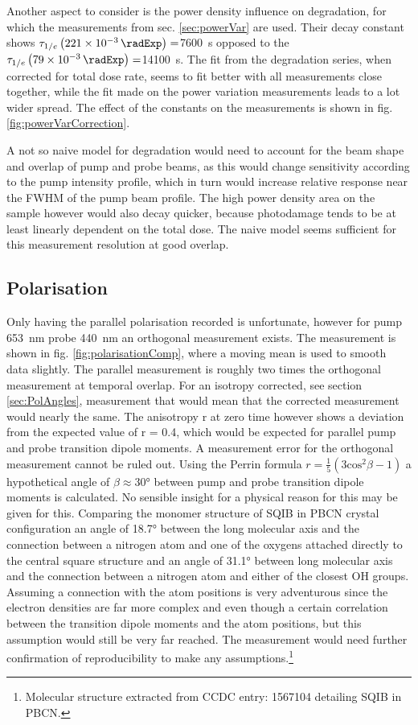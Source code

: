 \documentclass[twoside,openright]{scrreprt}
\begin{document}
{Another aspect to consider is the power density influence on degradation, for which the measurements from sec. \ref{sec:powerVar} are used.  Their decay constant shows $\tau_{1/e}\left(\SI{221e-3}{\radExp}\right)=$\SI{7600}{\second}  opposed to the $\tau_{1/e}\left(\SI{79e-3}{\radExp}\right)=$\SI{14100}{\second}. The fit from the degradation series, when corrected for total dose rate, seems to fit better with all measurements close together, while the fit made on the power variation measurements leads to a lot wider spread. The effect of the constants on the measurements is shown in fig. \ref{fig:powerVarCorrection}.

A not so naive model for degradation would need to account for the beam shape and overlap of pump and probe beams, as this would change sensitivity according to the pump intensity profile, which in turn would increase relative response near the FWHM of the pump beam profile. The high power density area on the sample however would also decay quicker, because photodamage tends to be at least linearly dependent on the total dose. The naive model seems sufficient for this measurement resolution at good overlap.

\subsection{Polarisation}
Only having the parallel polarisation recorded is unfortunate, however for pump \SI{653}{\nano\meter} probe \SI{440}{\nano\meter} an orthogonal measurement exists. The measurement is shown in fig. \ref{fig:polarisationComp}, where a moving mean is used to smooth data slightly. The parallel measurement is roughly two times the orthogonal measurement at temporal overlap. For an isotropy corrected, see section \ref{sec:PolAngles}, measurement that would mean that the corrected measurement would nearly the same. The anisotropy r at zero time however shows a deviation from the expected value of r = 0.4, which would be expected for parallel pump and probe transition dipole moments. A measurement error for the orthogonal measurement cannot be ruled out. Using the Perrin formula $r = \frac{1}{5}(3\mathrm{cos}^2\beta-1)$ a hypothetical angle of $\beta \approx \ang{30}$ between pump and probe transition dipole moments is calculated. No sensible insight for a physical reason for this may be given for this. 
Comparing the monomer structure of SQIB in PBCN crystal configuration an angle of \ang{18.7} between the long molecular axis and the connection between a nitrogen atom and one of the oxygens attached directly to the central square structure and an angle of \ang{31.1} between long molecular axis and the connection between a nitrogen atom and either of the closest OH groups. Assuming a connection with the atom positions is very adventurous since the electron densities are far more complex and even though a certain correlation between the transition dipole moments and the atom positions, but this assumption would still be very far reached. The measurement would need further confirmation of reproducibility to make any assumptions.\footnote{Molecular structure extracted from CCDC entry: 1567104 detailing SQIB in PBCN.}

}
\end{document}
